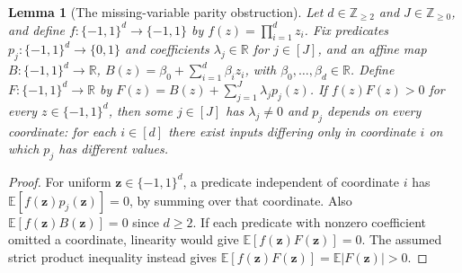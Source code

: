 \documentclass[11pt]{article}
\newtheorem{lemma}[theorem]{Lemma}
\newcommand{\bits}{\{0,1\}}
\begin{document}
\begin{lemma}[The missing-variable parity obstruction]\label{lem:paritydual}
Let $d\in\mathbb Z_{\ge2}$ and $J\in\mathbb Z_{\ge0}$, and define
$f:\{-1,1\}^d\to\{-1,1\}$ by $f(z)=\prod_{i=1}^d z_i$.
Fix predicates $p_j:\{-1,1\}^d\to\bits$ and coefficients
$\lambda_j\in\mathbb R$ for $j\in[J]$, and an affine map
$B:\{-1,1\}^d\to\mathbb R$,
$B(z)=\beta_0+\sum_{i=1}^d\beta_i z_i$, with $\beta_0,\ldots,\beta_d\in\mathbb R$.
Define $F:\{-1,1\}^d\to\mathbb R$ by
$F(z)=B(z)+\sum_{j=1}^J\lambda_jp_j(z)$.
If $f(z)F(z)>0$ for every $z\in\{-1,1\}^d$, then some $j\in[J]$
has $\lambda_j\ne0$ and $p_j$ depends on every coordinate: for each
$i\in[d]$ there exist inputs differing only in coordinate $i$ on which
$p_j$ has different values.
\end{lemma}
\begin{proof}
For uniform $\boldsymbol z\in\{-1,1\}^d$, a predicate independent of
coordinate $i$ has
$\mathbb E[f(\boldsymbol z)p_j(\boldsymbol z)]=0$, by summing over that
coordinate. Also $\mathbb E[f(\boldsymbol z)B(\boldsymbol z)]=0$
since $d\ge2$. If each predicate with nonzero coefficient omitted a
coordinate, linearity would give $\mathbb E[f(\boldsymbol z)F(\boldsymbol z)]=0$.
The assumed strict product inequality instead gives
$\mathbb E[f(\boldsymbol z)F(\boldsymbol z)]=\mathbb E|F(\boldsymbol z)|>0$.
\end{proof}
\end{document}
